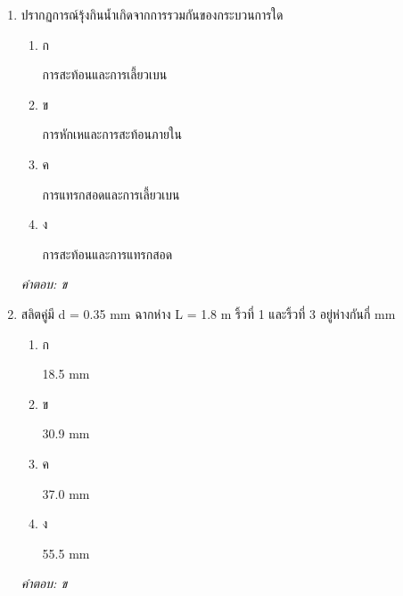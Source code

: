 \documentclass[12pt]{article}
\begin{document}
\begin{enumerate}[label=\arabic*., itemsep=0.5\baselineskip, topsep=0.5\baselineskip, leftmargin=*]
\item ปรากฏการณ์รุ้งกินน้ำเกิดจากการรวมกันของกระบวนการใด
\begin{enumerate}[label=\alph*)., itemsep=0.3\baselineskip, topsep=0.3\baselineskip]
\item ก\ 
\begin{minipage}[t]{0.9\linewidth}
\raggedright การสะท้อนและการเลี้ยวเบน
\end{minipage}
\item ข\ 
\begin{minipage}[t]{0.9\linewidth}
\raggedright การหักเหและการสะท้อนภายใน
\end{minipage}
\item ค\ 
\begin{minipage}[t]{0.9\linewidth}
\raggedright การแทรกสอดและการเลี้ยวเบน
\end{minipage}
\item ง\ 
\begin{minipage}[t]{0.9\linewidth}
\raggedright การสะท้อนและการแทรกสอด
\end{minipage}
\end{enumerate}
\vspace{-0.3\baselineskip}
\begin{small}
\textit{คำตอบ: ข}
\end{small}

\item สลิตคู่มี d = 0.35 mm ฉากห่าง L = 1.8 m ริ้วที่ 1 และริ้วที่ 3 อยู่ห่างกันกี่ mm
\begin{enumerate}[label=\alph*)., itemsep=0.3\baselineskip, topsep=0.3\baselineskip]
\item ก\ 
\begin{minipage}[t]{0.9\linewidth}
\raggedright 18.5 mm
\end{minipage}
\item ข\ 
\begin{minipage}[t]{0.9\linewidth}
\raggedright 30.9 mm
\end{minipage}
\item ค\ 
\begin{minipage}[t]{0.9\linewidth}
\raggedright 37.0 mm
\end{minipage}
\item ง\ 
\begin{minipage}[t]{0.9\linewidth}
\raggedright 55.5 mm
\end{minipage}
\end{enumerate}
\vspace{-0.3\baselineskip}
\begin{small}
\textit{คำตอบ: ข}
\end{small}


\end{enumerate}
\end{document}
